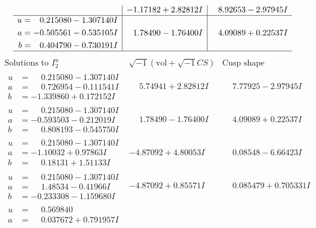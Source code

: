 \documentclass[1p]{elsarticle_modified}
\theoremstyle{definition}
\newcommand{\I}{\sqrt{-1}}
\begin{document}
$$\begin{array}{c|c|c}
 & -1.17182 + 2.82812 I & \phantom{-}8.92653 - 2.97945 I \\ \hline\begin{aligned}
u &= \phantom{-}0.215080 - 1.307140 I \\
a &= -0.505561 - 0.535105 I \\
b &= \phantom{-}0.404790 - 0.730191 I\end{aligned}
 & \phantom{-}1.78490 - 1.76400 I & \phantom{-}4.09089 + 0.22537 I\\
 \hline 
 \end{array}$$\newpage$$\begin{array}{c|c|c}  
\text{Solutions to }I^u_{2}& \I (\text{vol} + \sqrt{-1}CS) & \text{Cusp shape}\\
 \hline 
\begin{aligned}
u &= \phantom{-}0.215080 - 1.307140 I \\
a &= \phantom{-}0.726954 - 0.111541 I \\
b &= -1.339860 + 0.172152 I\end{aligned}
 & \phantom{-}5.74941 + 2.82812 I & \phantom{-}7.77925 - 2.97945 I \\ \hline\begin{aligned}
u &= \phantom{-}0.215080 - 1.307140 I \\
a &= -0.593503 - 0.212019 I \\
b &= \phantom{-}0.808193 - 0.545750 I\end{aligned}
 & \phantom{-}1.78490 - 1.76400 I & \phantom{-}4.09089 + 0.22537 I \\ \hline\begin{aligned}
u &= \phantom{-}0.215080 - 1.307140 I \\
a &= -1.10032 + 0.97863 I \\
b &= \phantom{-}0.18131 + 1.51133 I\end{aligned}
 & -4.87092 + 4.80053 I & \phantom{-}0.08548 - 6.66423 I \\ \hline\begin{aligned}
u &= \phantom{-}0.215080 - 1.307140 I \\
a &= \phantom{-}1.48534 - 0.41966 I \\
b &= -0.233308 - 1.159680 I\end{aligned}
 & -4.87092 + 0.85571 I & \phantom{-}0.085479 + 0.705331 I \\ \hline\begin{aligned}
u &= \phantom{-}0.569840\phantom{ +0.000000I} \\
a &= \phantom{-}0.037672 + 0.791957 I \\

\end{aligned}
\end{array}$$
\end{document}
